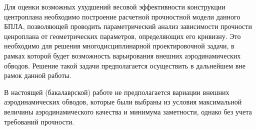



Для оценки возможных ухудшений весовой эффективности конструкции центроплана необходимо построение расчетной прочностной модели данного БПЛА, позволяющей проводить параметрический анализ зависимости прочности ценроплана от геометрических параметров, определяющих его кривизну. Это необходимо для решения многодисциплинарной проектировочной задачи, в рамках которой будет возможность варьирования внешних аэродинамических обводов. 
Решение такой задачи предполагается осуществить в дальнейшем вне рамок данной работы. 

В настоящей (бакалаврской) работе не предполагается вариации внешних аэродинамических обводов, которые были выбраны из условия максимальной величины аэродинамического качества и минимума заметности, однако без учета требований прочности. 





 
  
  

%

